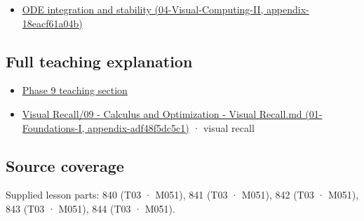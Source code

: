 \begin{itemize}
\tightlist
\item
  \href{}{ODE integration and stability (04-Visual-Computing-II, appendix-18eacf61a04b)}
\end{itemize}

\subsection{Full teaching explanation}\label{full-teaching-explanation}

\begin{itemize}
\tightlist
\item
  \href{Continuous\%20Notes/Computing\%20Foundations\%20-\%20From\%20Bits\%20to\%20C++\%20and\%20Systems\%20APIs\#ODEs\%20and\%20numerical\%20simulation}{Phase 9 teaching section}
\item
  \href{}{Visual Recall/09 - Calculus and Optimization - Visual Recall.md (01-Foundations-I, appendix-adf48f5dc5c1)} · visual recall
\end{itemize}

\subsection{Source coverage}\label{source-coverage}

Supplied lesson parts: 840 (T03 · M051), 841 (T03 · M051), 842 (T03 · M051), 843 (T03 · M051), 844 (T03 · M051).
